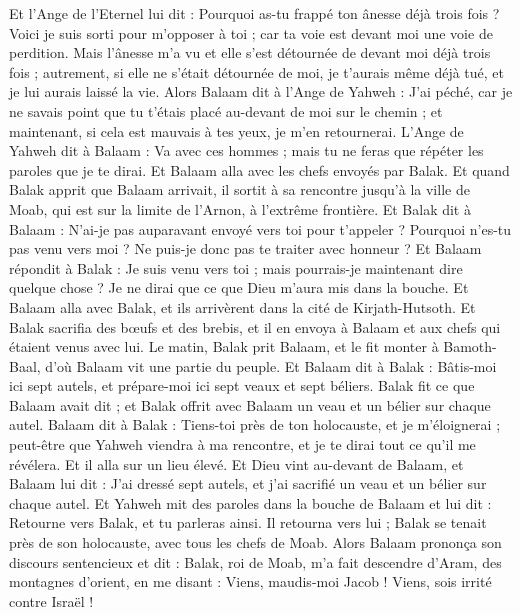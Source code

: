 \begin{multicols}{2}
Et l'Ange de l'Eternel lui dit : Pourquoi as-tu frappé ton ânesse déjà trois fois ? Voici je suis sorti pour m'opposer à toi ; car ta voie est devant moi une voie de perdition.
Mais l'ânesse m'a vu et elle s'est détournée de devant moi déjà trois fois ; autrement, si elle ne s'était détournée de moi, je t'aurais même déjà tué, et je lui aurais laissé la vie.
Alors Balaam dit à l'Ange de Yahweh : J'ai péché, car je ne savais point que tu t'étais placé au-devant de moi sur le chemin ; et maintenant, si cela est mauvais à tes yeux, je m’en retournerai.
L'Ange de Yahweh dit à Balaam : Va avec ces hommes ; mais tu ne feras que répéter les paroles que je te dirai. Et Balaam alla avec les chefs envoyés par Balak.
Et quand Balak apprit que Balaam arrivait, il sortit à sa rencontre jusqu'à la ville de Moab, qui est sur la limite de l'Arnon, à l'extrême frontière.
Et Balak dit à Balaam : N'ai-je pas auparavant envoyé vers toi pour t'appeler ? Pourquoi n'es-tu pas venu vers moi ? Ne puis-je donc pas te traiter avec honneur ?
Et Balaam répondit à Balak : Je suis venu vers toi ; mais pourrais-je maintenant dire quelque chose ? Je ne dirai que ce que Dieu m'aura mis dans la bouche.
Et Balaam alla avec Balak, et ils arrivèrent dans la cité de Kirjath-Hutsoth.
Et Balak sacrifia des bœufs et des brebis, et il en envoya à Balaam et aux chefs qui étaient venus avec lui.
Le matin, Balak prit Balaam, et le fit monter à Bamoth-Baal, d'où Balaam vit une partie du peuple.
\VerseOne{}Et Balaam dit à Balak : Bâtis-moi ici sept autels, et prépare-moi ici sept veaux et sept béliers.
Balak fit ce que Balaam avait dit ; et Balak offrit avec Balaam un veau et un bélier sur chaque autel.
Balaam dit à Balak : Tiens-toi près de ton holocauste, et je m'éloignerai ; peut-être que Yahweh viendra à ma rencontre, et je te dirai tout ce qu'il me révélera. Et il alla sur un lieu élevé.
Et Dieu vint au-devant de Balaam, et Balaam lui dit : J'ai dressé sept autels, et j'ai sacrifié un veau et un bélier sur chaque autel.
Et Yahweh mit des paroles dans la bouche de Balaam et lui dit : Retourne vers Balak, et tu parleras ainsi.
Il retourna vers lui ; Balak se tenait près de son holocauste, avec tous les chefs de Moab.
Alors Balaam prononça son discours sentencieux et dit : Balak, roi de Moab, m'a fait descendre d'Aram, des montagnes d'orient, en me disant : Viens, maudis-moi Jacob ! Viens, sois irrité contre Israël !

\end{multicols}
